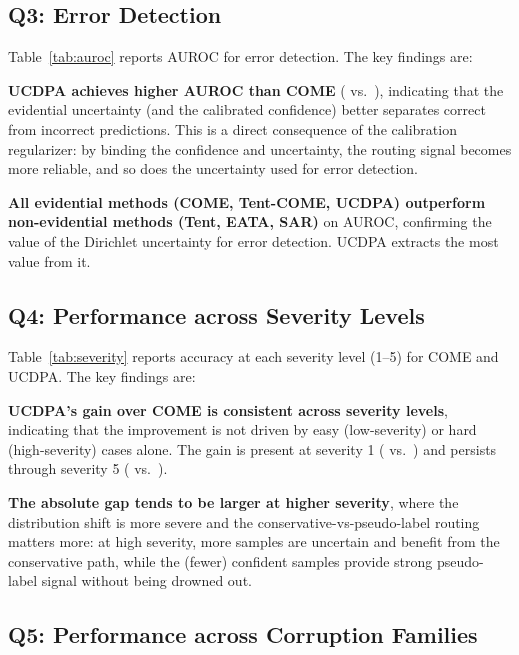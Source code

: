 \subsection{Q3: Error Detection}
\label{sec:exp:error-detection}



Table~\ref{tab:auroc} reports AUROC for error detection. The key findings are:

\textbf{UCDPA achieves higher AUROC than COME} (\ucdpaauroc{} vs.\ \comeauroc{}), indicating that the evidential uncertainty (and the calibrated confidence) better separates correct from incorrect predictions. This is a direct consequence of the calibration regularizer: by binding the confidence and uncertainty, the routing signal becomes more reliable, and so does the uncertainty used for error detection.

\textbf{All evidential methods (COME, Tent-COME, UCDPA) outperform non-evidential methods (Tent, EATA, SAR)} on AUROC, confirming the value of the Dirichlet uncertainty for error detection. UCDPA extracts the most value from it.

\subsection{Q4: Performance across Severity Levels}
\label{sec:exp:severity}



Table~\ref{tab:severity} reports accuracy at each severity level (1--5) for COME and UCDPA. The key findings are:

\textbf{UCDPA's gain over COME is consistent across severity levels}, indicating that the improvement is not driven by easy (low-severity) or hard (high-severity) cases alone. The gain is present at severity 1 (\ucdpasevone{} vs.\ \comesevone{}) and persists through severity 5 (\ucdpasevfive{} vs.\ \comesevfive{}).

\textbf{The absolute gap tends to be larger at higher severity}, where the distribution shift is more severe and the conservative-vs-pseudo-label routing matters more: at high severity, more samples are uncertain and benefit from the conservative path, while the (fewer) confident samples provide strong pseudo-label signal without being drowned out.

\subsection{Q5: Performance across Corruption Families}
\label{sec:exp:family}

